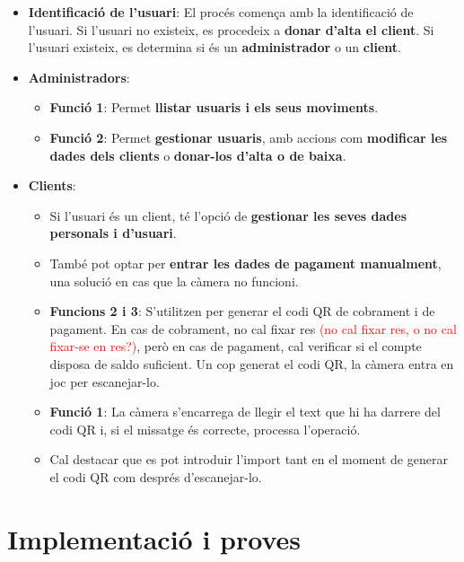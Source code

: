 \documentclass[a4paper,12pt,twoside]{ThesisStyle}
\newcommand{\pau}[1]{\textcolor{red}{#1}}
\begin{document}
\begin{itemize}
    \item \textbf{Identificació de l'usuari}: El procés comença amb la identificació de l'usuari. Si l'usuari no existeix, es procedeix a \textbf{donar d'alta el client}. Si l'usuari existeix, es determina si és un \textbf{administrador} o un \textbf{client}.
    
    \item \textbf{Administradors}: 
    \begin{itemize}
        \item \textbf{Funció 1}: Permet \textbf{llistar usuaris i els seus moviments}.
        \item \textbf{Funció 2}: Permet \textbf{gestionar usuaris}, amb accions com \textbf{modificar les dades dels clients} o \textbf{donar-los d'alta o de baixa}.
    \end{itemize}
    
    \item \textbf{Clients}: 
    \begin{itemize}
        \item Si l'usuari és un client, té l'opció de \textbf{gestionar les seves dades personals i d'usuari}.
        \item També pot optar per \textbf{entrar les dades de pagament manualment}, una solució en cas que la càmera no funcioni.
        \item \textbf{Funcions 2 i 3}: S'utilitzen per generar el codi QR de cobrament i de pagament. En cas de cobrament, no cal fixar res \pau{(no cal fixar res, o no cal fixar-se en res?)}, però en cas de pagament, cal verificar si el compte disposa de saldo suficient. Un cop generat el codi QR, la càmera entra en joc per escanejar-lo.
        \item \textbf{Funció 1}: La càmera s'encarrega de llegir el text que hi ha darrere del codi QR i, si el missatge és correcte, processa l'operació.
        \item Cal destacar que es pot introduir l'import tant en el moment de generar el codi QR com després d'escanejar-lo.
    \end{itemize}
\end{itemize}




\chapter{Implementació i proves}
\label{chp:implementacio}
\end{document}
